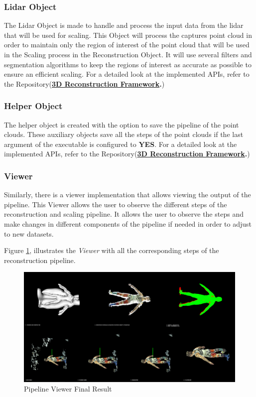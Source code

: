 \documentclass[12pt]{report}
\begin{document}
\subsubsection*{Lidar Object}
The Lidar Object is made to handle and process the input data from the lidar that will be used for scaling. 
This Object will process the captures point cloud in order to maintain only the region of interest of the point cloud that will be used in the Scaling process in the Reconstruction Object. 
It will use several filters and segmentation algorithms to keep the regions of interest as accurate as possible to ensure an efficient scaling.
For a detailed look at the implemented APIs, refer to the Repository(\textbf{\href{https://github.com/esteban-andrade/3D-Reconstructrion-Scanner} {3D Reconstruction Framework}.})

\subsubsection*{Helper Object}
The helper object is created with the option to save the pipeline of the point clouds. These auxiliary objects save all the steps of the point clouds if the last argument of the executable is configured to \textbf{YES}.
For a detailed look at the implemented APIs, refer to the Repository(\textbf{\href{https://github.com/esteban-andrade/3D-Reconstructrion-Scanner} {3D Reconstruction Framework}.})




\subsubsection*{Viewer}
Similarly, there is a viewer implementation that allows viewing the output of the pipeline. This Viewer allows the user to observe the different steps of the reconstruction and scaling pipeline.
It allows the user to observe the steps and make changes in different components of the pipeline if needed in order to adjust to new datasets.

Figure \ref{fig:pipeline_final}, illustrates the \textit{Viewer} with all the corresponding steps of the reconstruction pipeline.

\begin{figure}[H]%
  \centering
 \includegraphics[width=1\textwidth]{pipeline.png}
\caption{Pipeline Viewer Final Result}
\label{fig:pipeline_final} 
\end{figure}
\end{document}

